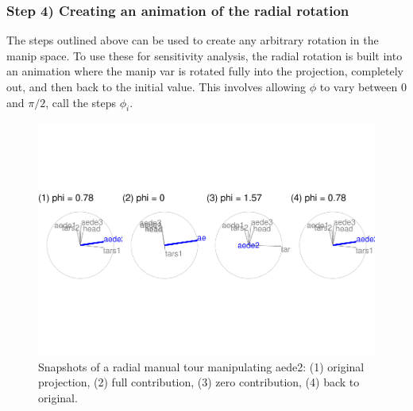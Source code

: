 \hypertarget{step-4-creating-an-animation-of-the-radial-rotation}{%
\subsubsection{Step 4) Creating an animation of the radial
rotation}\label{step-4-creating-an-animation-of-the-radial-rotation}}

The steps outlined above can be used to create any arbitrary rotation in
the manip space. To use these for sensitivity analysis, the radial
rotation is built into an animation where the manip var is rotated fully
into the projection, completely out, and then back to the initial value.
This involves allowing \(\phi\) to vary between \(0\) and \(\pi/2\),
call the steps \(\phi_i\).

\begin{Schunk}
\begin{figure}

{\centering \includegraphics[width=1\linewidth]{spyrison-cook_files/figure-latex/step3-1} 

}

\caption[Snapshots of a radial manual tour manipulating aede2]{Snapshots of a radial manual tour manipulating aede2: (1) original projection, (2) full contribution, (3) zero contribution, (4) back to original. }\label{fig:step3}
\end{figure}
\end{Schunk}

